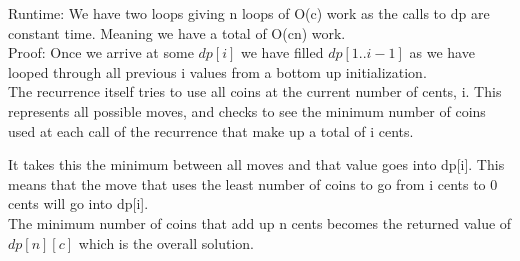 \documentclass[11pt,letter]{article}
\newcommand{\2}{\{0, 1\}}
\newcommand{\1}{\mathds{1}}
\theoremstyle{definition}
\begin{document}
Runtime: We have two loops giving n loops of O(c) work as the calls to dp are constant time. Meaning we have a total of O(cn) work.\\

Proof: Once we arrive at some $dp[i]$ we have filled $dp[1..i-1]$ as we have looped through all previous i values from a bottom up initialization. \\

The recurrence itself tries to use all coins at the current number of cents, i. This represents all possible moves, and checks to see the minimum number of coins used at each call of the recurrence that make up a total of i cents. 

It takes this the minimum between all moves and that value goes into dp[i]. This means that the move that uses the least number of coins to go from i cents to 0 cents will go into dp[i].\\

The minimum number of coins that add up n cents becomes the returned value of $dp[n][c]$ which is the overall solution.\\
\end{document}

